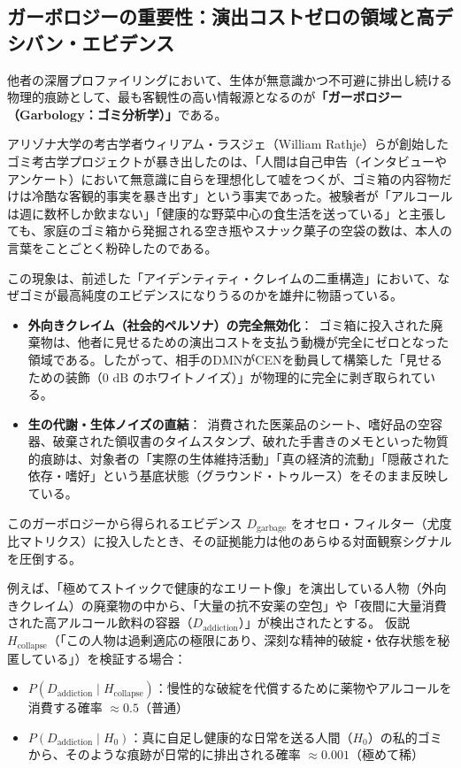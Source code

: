 \subsection{ガーボロジーの重要性：演出コストゼロの領域と高デシバン・エビデンス}

他者の深層プロファイリングにおいて、生体が無意識かつ不可避に排出し続ける物理的痕跡として、最も客観性の高い情報源となるのが\textbf{「ガーボロジー（Garbology：ゴミ分析学）」}である。

アリゾナ大学の考古学者ウィリアム・ラスジェ（William Rathje）らが創始したゴミ考古学プロジェクトが暴き出したのは、「人間は自己申告（インタビューやアンケート）において無意識に自らを理想化して嘘をつくが、ゴミ箱の内容物だけは冷酷な客観的事実を暴き出す」という事実であった。被験者が「アルコールは週に数杯しか飲まない」「健康的な野菜中心の食生活を送っている」と主張しても、家庭のゴミ箱から発掘される空き瓶やスナック菓子の空袋の数は、本人の言葉をことごとく粉砕したのである。

この現象は、前述した「アイデンティティ・クレイムの二重構造」において、なぜゴミが最高純度のエビデンスになりうるのかを雄弁に物語っている。
\begin{itemize}
\item \textbf{外向きクレイム（社会的ペルソナ）の完全無効化}：\
ゴミ箱に投入された廃棄物は、他者に見せるための演出コストを支払う動機が完全にゼロとなった領域である。したがって、相手のDMNがCENを動員して構築した「見せるための装飾（$0\text{ dB}$ のホワイトノイズ）」が物理的に完全に剥ぎ取られている。
\item \textbf{生の代謝・生体ノイズの直結}：\
消費された医薬品のシート、嗜好品の空容器、破棄された領収書のタイムスタンプ、破れた手書きのメモといった物質的痕跡は、対象者の「実際の生体維持活動」「真の経済的流動」「隠蔽された依存・嗜好」という基底状態（グラウンド・トゥルース）をそのまま反映している。
\end{itemize}

このガーボロジーから得られるエビデンス $D_{\mathrm{garbage}}$ をオセロ・フィルター（尤度比マトリクス）に投入したとき、その証拠能力は他のあらゆる対面観察シグナルを圧倒する。

例えば、「極めてストイックで健康的なエリート像」を演出している人物（外向きクレイム）の廃棄物の中から、「大量の抗不安薬の空包」や「夜間に大量消費された高アルコール飲料の容器（$D_{\mathrm{addiction}}$）」が検出されたとする。
仮説 $H_{\mathrm{collapse}}$（「この人物は過剰適応の極限にあり、深刻な精神的破綻・依存状態を秘匿している」）を検証する場合：
\begin{itemize}
\item $P(D_{\mathrm{addiction}} \mid H_{\mathrm{collapse}})$：慢性的な破綻を代償するために薬物やアルコールを消費する確率 $\approx 0.5$（普通）
\item $P(D_{\mathrm{addiction}} \mid H_0)$：真に自足し健康的な日常を送る人間（$H_0$）の私的ゴミから、そのような痕跡が日常的に排出される確率 $\approx 0.001$（極めて稀）
\end{itemize}

